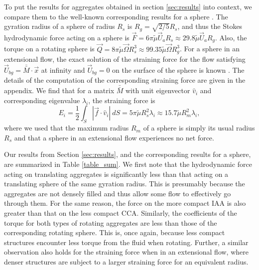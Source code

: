 To put the results for aggregates obtained in section \ref{sec:results} into context, we compare them to the well-known corresponding results for a sphere \cite{guazzelli_physical_2011}. 
The gyration radius of a sphere of radius $R_s$ is $R_g = \sqrt{2/5} R_s$, and thus the Stokes hydrodynamic force acting on a sphere is $\vec{F} = 6 \pi \tilde{\mu} \vec{U}_a R_s \approx 29.8 \tilde{\mu} \vec{U}_a  R_g$.  Also, the torque on a rotating sphere is $\vec{Q} = 8 \pi \tilde{\mu} \vec{\Omega} R_s^3 \approx 99.35 \tilde{\mu} \vec{\Omega} R_g^3$. For a sphere in an extensional flow, the exact solution of the straining force for the flow satisfying $\vec{U}_{bg} = \bar{\bar{M}}\cdot \vec{x}$ at infinity and $\vec{U}_{bg} = 0$ on the surface of the sphere is known \cite{guazzelli_physical_2011}. The details of the computation of the corresponding straining force are given in the appendix. We find that for a matrix $\bar{\bar{M}}$ with unit eigenvector $\hat{v}_i$ and corresponding eigenvalue $\lambda_i$, the straining force is
\[
E_{i}  = \frac{1}{2} \int_S | \vec{f} \cdot \hat{v}_i | \ dS = 5  \pi \tilde{\mu} R_s^2 \lambda_i \approx 15.7  \tilde{\mu} R_m^2  \lambda_i,
\] 
where we used that the maximum radius $R_m$ of a sphere is simply its usual radius $R_s$ and that a sphere in an extensional flow experiences no net force. 


Our results from Section \ref{sec:results}, and the corresponding results for a sphere, are summarized in Table  \ref{table_sum}. We first note that the hydrodynamic force acting on translating aggregates is significantly less than that acting on a translating sphere of the same gyration radius. This is presumably because the aggregates are not densely filled and thus allow some flow to effectively go through them. For the same reason, the force on the more compact IAA is also greater than that on the less compact CCA.
Similarly, the coefficients of the torque for both types of rotating aggregates are less than those of the corresponding rotating sphere. This is, once again, because less compact structures encounter less torque from the fluid when rotating. Further, a similar observation also holds for the straining force when in an extensional flow, where denser structures are subject to a larger straining force for an equivalent radius. 

